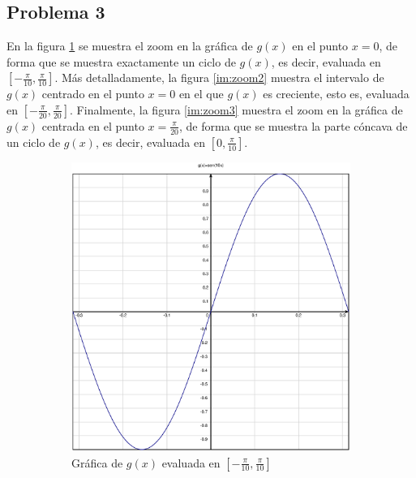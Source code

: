 \documentclass[10pt]{article}
\begin{document}
\subsection{Problema 3}
En la figura \ref{im:zoom1} se muestra el zoom en la gráfica de $g(x)$ en el punto $x=0$, de forma que se muestra exactamente un ciclo de $g(x)$, es decir, evaluada en $\left[-\frac{\pi}{10},\frac{\pi}{10}\right]$. Más detalladamente, la figura \ref{im:zoom2} muestra el intervalo de $g(x)$ centrado en el punto $x=0$ en el que $g(x)$ es creciente, esto es, evaluada en $\left[-\frac{\pi}{20},\frac{\pi}{20}\right]$. Finalmente, la figura \ref{im:zoom3} muestra el zoom en la gráfica de $g(x)$ centrada en el punto $x=\frac{\pi}{20}$, de forma que se muestra la parte cóncava de un ciclo de $g(x)$, es decir, evaluada en $\left[0,\frac{\pi}{10}\right]$.
\begin{figure}[H]
    \begin{subfigure}[b]{0.3\textwidth}
        \includegraphics[width=\textwidth]{figures/Zoom1.eps}
        \centering
        \caption{Gráfica de $g(x)$ evaluada en $\left[-\frac{\pi}{10},\frac{\pi}{10}\right]$}
        \label{im:zoom1}
    \end{subfigure}
    \hfill
    \begin{subfigure}[b]{0.3\textwidth}

\end{subfigure}
\end{figure}
\end{document}
